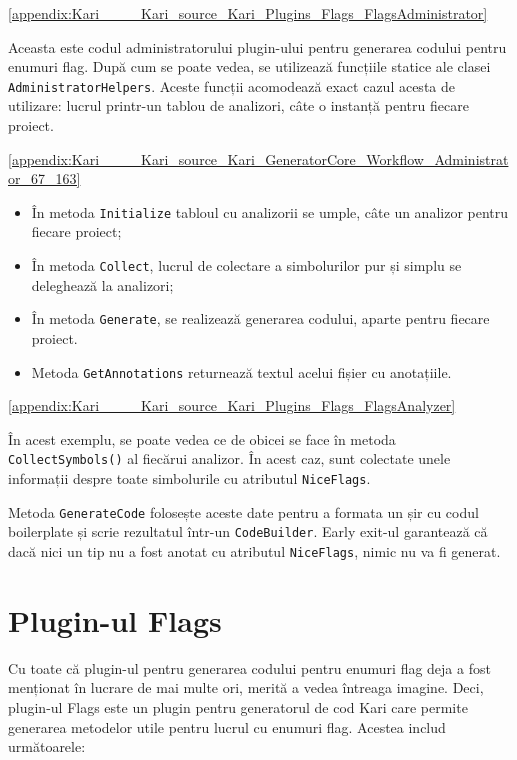 \documentclass[a4paper,12pt]{report}
\begin{document}
\ref{appendix:Kari____Kari_source_Kari_Plugins_Flags_FlagsAdministrator}

Aceasta este codul administratorului plugin-ului pentru generarea codului pentru enumuri flag.
După cum se poate vedea, se utilizează funcțiile statice ale clasei \texttt{AdministratorHelpers}.
Aceste funcții acomodează exact cazul acesta de utilizare: lucrul printr-un tablou de analizori, câte o instanță pentru fiecare proiect.

\ref{appendix:Kari____Kari_source_Kari_GeneratorCore_Workflow_Administrator_67_163}

\begin{itemize}
  \item În metoda \texttt{Initialize\(\)} tabloul cu analizorii se umple, câte un analizor pentru fiecare proiect;
  \item În metoda \texttt{Collect\(\)}, lucrul de colectare a simbolurilor pur și simplu se deleghează la analizori;
  \item În metoda \texttt{Generate\(\)}, se realizează generarea codului, aparte pentru fiecare proiect.
  \item Metoda \texttt{GetAnnotations\(\)} returnează textul acelui fișier cu anotațiile.
\end{itemize}

\ref{appendix:Kari____Kari_source_Kari_Plugins_Flags_FlagsAnalyzer}

În acest exemplu, se poate vedea ce de obicei se face în metoda \texttt{CollectSymbols()} al fiecărui analizor.
În acest caz, sunt colectate unele informații despre toate simbolurile cu atributul \texttt{NiceFlags}.




Metoda \texttt{GenerateCode\(\)} folosește aceste date pentru a formata un șir cu codul boilerplate și scrie rezultatul într-un \texttt{CodeBuilder}.
Early exit-ul garantează că dacă nici un tip nu a fost anotat cu atributul \texttt{NiceFlags}, nimic nu va fi generat.


\section{Plugin-ul Flags}

Cu toate că plugin-ul pentru generarea codului pentru enumuri flag deja a fost menționat în lucrare de mai multe ori, merită a vedea întreaga imagine.
Deci, plugin-ul Flags este un plugin pentru generatorul de cod Kari care permite generarea metodelor utile pentru lucrul cu enumuri flag.
Acestea includ următoarele:
\end{document}
